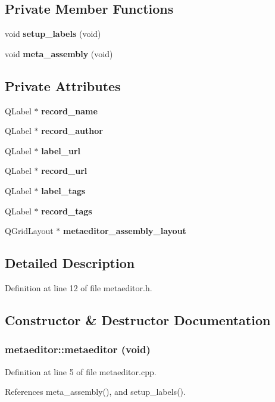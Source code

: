 \subsection*{Private Member Functions}
\begin{CompactItemize}
\item 
void {\bf setup\_\-labels} (void)
\item 
void {\bf meta\_\-assembly} (void)
\end{CompactItemize}
\subsection*{Private Attributes}
\begin{CompactItemize}
\item 
QLabel $\ast$ {\bf record\_\-name}
\item 
QLabel $\ast$ {\bf record\_\-author}
\item 
QLabel $\ast$ {\bf label\_\-url}
\item 
QLabel $\ast$ {\bf record\_\-url}
\item 
QLabel $\ast$ {\bf label\_\-tags}
\item 
QLabel $\ast$ {\bf record\_\-tags}
\item 
QGrid\-Layout $\ast$ {\bf metaeditor\_\-assembly\_\-layout}
\end{CompactItemize}


\subsection{Detailed Description}




Definition at line 12 of file metaeditor.h.

\subsection{Constructor \& Destructor Documentation}
\subsubsection{\setlength{\rightskip}{0pt plus 5cm}metaeditor::metaeditor (void)}\label{classmetaeditor_e9fe78e661a20bfc001ac7bab2f2a811}




Definition at line 5 of file metaeditor.cpp.

References meta\_\-assembly(), and setup\_\-labels().

